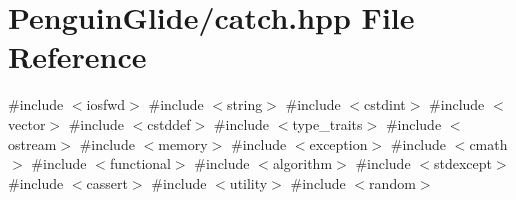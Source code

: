 \section{Penguin\+Glide/catch.hpp File Reference}
\label{catch_8hpp}
{\ttfamily \#include $<$iosfwd$>$}\newline
{\ttfamily \#include $<$string$>$}\newline
{\ttfamily \#include $<$cstdint$>$}\newline
{\ttfamily \#include $<$vector$>$}\newline
{\ttfamily \#include $<$cstddef$>$}\newline
{\ttfamily \#include $<$type\+\_\+traits$>$}\newline
{\ttfamily \#include $<$ostream$>$}\newline
{\ttfamily \#include $<$memory$>$}\newline
{\ttfamily \#include $<$exception$>$}\newline
{\ttfamily \#include $<$cmath$>$}\newline
{\ttfamily \#include $<$functional$>$}\newline
{\ttfamily \#include $<$algorithm$>$}\newline
{\ttfamily \#include $<$stdexcept$>$}\newline
{\ttfamily \#include $<$cassert$>$}\newline
{\ttfamily \#include $<$utility$>$}\newline
{\ttfamily \#include $<$random$>$}\newline
